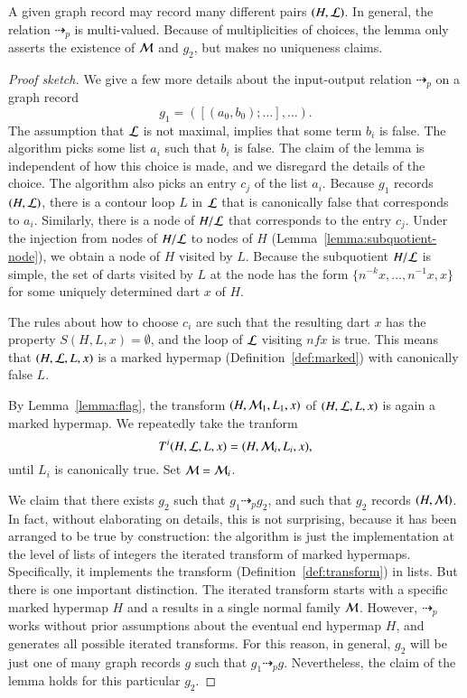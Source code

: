 \begin{remark}
  A given graph record may record many different pairs $(H,{\cal L})$.
  In general, the relation $\dashrightarrow_p$ is multi-valued.
  Because of multiplicities of choices, the lemma only asserts the
  existence of ${\cal M}$ and $g_2$, but makes no uniqueness claims.
\end{remark}

\begin{proof}[Proof sketch]
We give a few more details about the input-output relation
$\dashrightarrow_p$ on a graph record 
\[
g_1 = ([(a_0,b_0);\ldots],\ldots).
\]
The assumption that ${\cal L}$ is not maximal, implies that some term
$b_i$ is false.  The algorithm picks some list $a_i$ such that $b_i$
is false.  The claim of the lemma is independent of how this choice is
made, and we disregard the details of the choice.  The algorithm also
picks an entry $c_j$ of the list $a_i$.  Because $g_1$ records
$(H,{\cal L})$, there is a contour loop $L$ in ${\cal L}$ that is
canonically false that corresponds to $a_i$.  Similarly, there is a
node of $H/{\cal L}$ that corresponds to the entry $c_j$.  Under the
injection from nodes of $H/{\cal L}$ to nodes of $H$
(Lemma~\ref{lemma:subquotient-node}), we obtain a node of $H$ visited
by $L$.  Because the subquotient $H/{\cal L}$ is simple, the set of
darts visited by $L$ at the node has the form $\{n^{-k}
x,\ldots,n^{-1}x,x\}$ for some uniquely determined dart $x$ of $H$.

The rules about how to choose $c_i$ are such that the resulting dart
$x$ has the property $S(H,L,x)=\emptyset$, and the loop of ${\cal L}$
visiting $n f x$ is true.  This means that $(H,{\cal L},L,x)$ is a
marked hypermap (Definition~\ref{def:marked}) with canonically false
$L$.

By Lemma~\ref{lemma:flag}, the transform $(H,{\cal M}_1,L_1,x)$ of
$(H,{\cal L},L,x)$ is again a marked hypermap.  We repeatedly take the
tranform
\[
T^i(H,{\cal L},L,x) = (H,{\cal M}_i,L_i,x),
\]
until $L_i$ is canonically true.  Set ${\cal M}={\cal M}_i$.

We claim that there exists $g_2$ such that $g_1 \dashrightarrow_p
g_2$, and such that $g_2$ records $(H,{\cal M})$.  In fact, without
elaborating on details, this is not surprising, because it has been
arranged to be true by construction: the algorithm is just the
implementation at the level of lists of integers the iterated
transform of marked hypermaps.  Specifically, it implements the
transform (Definition~\ref{def:transform}) in lists.  But there is one important
distinction.  The iterated transform starts with a specific marked
hypermap $H$ and a results in a single normal family ${\cal M}$.
However, $\dashrightarrow_p$ works without prior assumptions about the
eventual end hypermap $H$, and generates all possible iterated
transforms.  For this reason, in general, $g_2$ will be just one of
many graph records $g$ such that $g_1\dashrightarrow_p g$.  Nevertheless,
the claim of the lemma holds for this particular $g_2$.
\end{proof}

